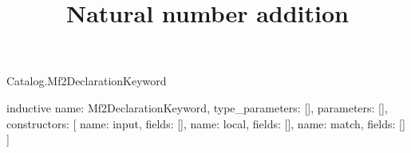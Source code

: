 \begin{lexlean}{Catalog.Mf2DeclarationKeyword}
\title{Natural number addition}
\begin{semanticmodule}
inductive{
  name: Mf2DeclarationKeyword,
  type_parameters: [],
  parameters: [],
  constructors: [
    {name: input, fields: []},
    {name: local, fields: []},
    {name: match, fields: []}
  ]
}
\end{semanticmodule}
\end{lexlean}
